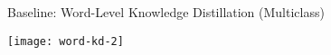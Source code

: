 \begin{frame}{Baseline: Word-Level Knowledge Distillation (Multiclass)}

  \begin{center}
    \texttt{[image: word-kd-2]}
  \end{center}





\end{frame}





